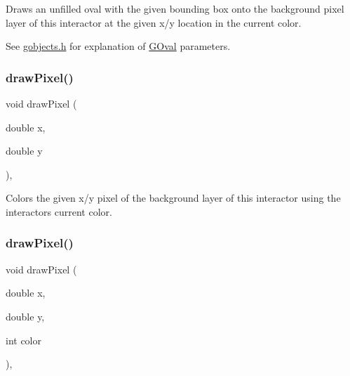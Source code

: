 Draws an unfilled oval with the given bounding box onto the background pixel layer of this interactor at the given x/y location in the current color. 

See \mbox{\hyperlink{gobjects_8h_source}{gobjects.\+h}} for explanation of \mbox{\hyperlink{classGOval}{G\+Oval}} parameters. \mbox{\label{classGDrawingSurface_a0c1e2923d8d163d62d0896d8c5cfa191}} 
\subsubsection{\texorpdfstring{draw\+Pixel()}{drawPixel()}\hspace{0.1cm}{\footnotesize\ttfamily [1/3]}}
{\footnotesize\ttfamily void draw\+Pixel (\begin{DoxyParamCaption}\item[{double}]{x,  }\item[{double}]{y }\end{DoxyParamCaption})\hspace{0.3cm}{\ttfamily [virtual]}, {\ttfamily [inherited]}}



Colors the given x/y pixel of the background layer of this interactor using the interactor\textquotesingle{}s current color. 

\mbox{\label{classGDrawingSurface_a3a64eb6383e601be8438e9c71643c432}} 
\subsubsection{\texorpdfstring{draw\+Pixel()}{drawPixel()}\hspace{0.1cm}{\footnotesize\ttfamily [2/3]}}
{\footnotesize\ttfamily void draw\+Pixel (\begin{DoxyParamCaption}\item[{double}]{x,  }\item[{double}]{y,  }\item[{int}]{color }\end{DoxyParamCaption})\hspace{0.3cm}{\ttfamily [virtual]}, {\ttfamily [inherited]}}



